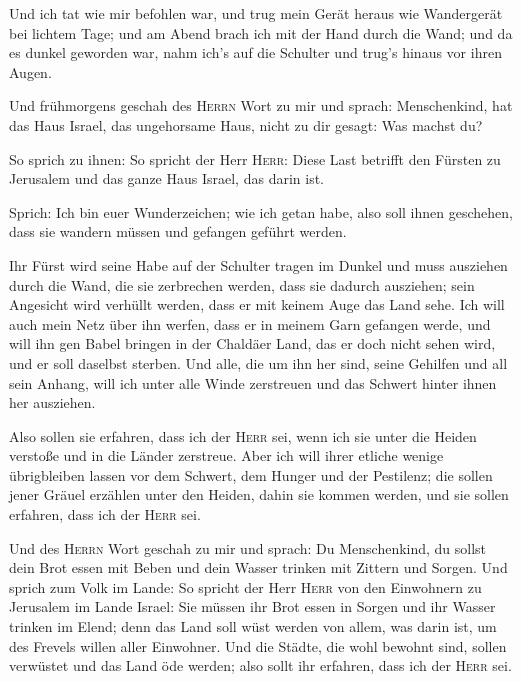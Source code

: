  Und ich tat wie mir befohlen war, und trug mein Gerät
heraus wie Wandergerät bei lichtem Tage; und am Abend brach ich mit der
Hand durch die Wand; und da es dunkel geworden war, nahm ich's auf die
Schulter und trug's hinaus vor ihren Augen.

 Und frühmorgens geschah des \textsc{Herrn} Wort zu mir
und sprach:  Menschenkind, hat das Haus Israel, das
ungehorsame Haus, nicht zu dir gesagt: Was machst du?

 So sprich zu ihnen: So spricht der Herr \textsc{Herr}:
Diese Last betrifft den Fürsten zu Jerusalem und das ganze Haus Israel,
das darin ist.

 Sprich: Ich bin euer Wunderzeichen; wie ich getan habe,
also soll ihnen geschehen, dass sie wandern müssen und gefangen geführt
werden.

 Ihr Fürst wird seine Habe auf der Schulter tragen im
Dunkel und muss ausziehen durch die Wand, die sie zerbrechen werden,
dass sie dadurch ausziehen; sein Angesicht wird verhüllt werden, dass er
mit keinem Auge das Land sehe.  Ich will auch mein Netz
über ihn werfen, dass er in meinem Garn gefangen werde, und will ihn gen
Babel bringen in der Chaldäer Land, das er doch nicht sehen wird, und er
soll daselbst sterben.  Und alle, die um ihn her sind,
seine Gehilfen und all sein Anhang, will ich unter alle Winde zerstreuen
und das Schwert hinter ihnen her ausziehen.

 Also sollen sie erfahren, dass ich der \textsc{Herr}
sei, wenn ich sie unter die Heiden verstoße und in die Länder zerstreue.
 Aber ich will ihrer etliche wenige übrigbleiben lassen
vor dem Schwert, dem Hunger und der Pestilenz; die sollen jener Gräuel
erzählen unter den Heiden, dahin sie kommen werden, und sie sollen
erfahren, dass ich der \textsc{Herr} sei.

 Und des \textsc{Herrn} Wort geschah zu mir und sprach:
 Du Menschenkind, du sollst dein Brot essen mit Beben und
dein Wasser trinken mit Zittern und Sorgen.  Und sprich
zum Volk im Lande: So spricht der Herr \textsc{Herr} von den Einwohnern
zu Jerusalem im Lande Israel: Sie müssen ihr Brot essen in Sorgen und
ihr Wasser trinken im Elend; denn das Land soll wüst werden von allem,
was darin ist, um des Frevels willen aller Einwohner. 
Und die Städte, die wohl bewohnt sind, sollen verwüstet und das Land öde
werden; also sollt ihr erfahren, dass ich der \textsc{Herr} sei.

